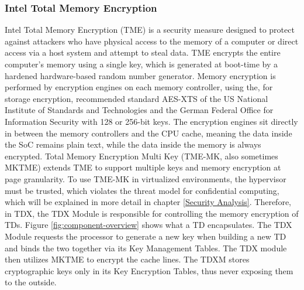 \subsubsection{Intel Total Memory Encryption}
Intel Total Memory Encryption (TME) is a security measure designed to protect against attackers who have physical access to the memory of a computer or direct access via a host system and attempt to steal data. TME encrypts the entire computer's memory using a single key, which is generated at boot-time by a hardened hardware-based random number generator. Memory encryption is performed by encryption engines on each memory controller, using the, for storage encryption, recommended standard AES-XTS of the US National Institute of Standards and Technologies \cite{NIST} and the German Federal Office for Information Security with 128 or 256-bit keys\cite[~p. 24]{bsi_aes_2023}. The encryption engines sit directly in between the memory controllers and the CPU cache, meaning the data inside the SoC remains plain text, while the data inside the memory is always encrypted. Total Memory Encryption Multi Key (TME-MK, also sometimes MKTME) extends TME to support multiple keys and memory encryption at page granularity. To use TME-MK in virtualized environments, the hypervisor must be trusted, which violates the threat model for confidential computing, which will be explained in more detail in chapter \ref{Security Analysis}. Therefore, in TDX, the TDX Module is responsible for controlling the memory encryption of TDs. Figure \ref{fig:component-overview} shows what a TD encapsulates. The TDX Module requests the processor to generate a new key when building a new TD and binds the two together via its Key Management Tables. The TDX module then utilizes MKTME to encrypt the cache lines. The TDXM stores cryptographic keys only in its Key Encryption Tables, thus never exposing them to the outside\cite{cheng_intel_tdx_demystified_2023}. 

